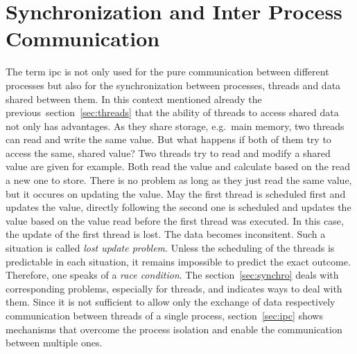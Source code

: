 \section{Synchronization and Inter Process Communication}\label{sec:ipc-and-synchro}
The term \acf{ipc} is not only used for the pure communication between different processes but also for the synchronization between processes, threads and data shared between them.
In this context mentioned already the previous~section~\ref{sec:threads} that the ability of threads to access shared data not only has advantages.
As they share storage, e.g.\ main memory, two threads can read and write the same value.
But what happens if both of them try to access the same, shared value?
Two threads try to read and modify a shared value are given for example.
Both read the value and calculate based on the read a new one to store. 
There is no problem as long as they just read the same value, but it occures on updating the value.
May the first thread is scheduled first and updates the value, directly following the second one is scheduled and updates the value based on the value read before the first thread was executed.
In this case, the update of the first thread is lost. 
The data becomes inconsitent.
Such a situation is called \textit{lost update problem}\cite{glatz2015betriebssysteme}.
Unless the scheduling of the threads is predictable in each situation, it remains impossible to predict the exact outcome.
Therefore, one speaks of a \textit{race condition}\cite{tanenbaum-modern-operating-systems}.
The section~\ref{sec:synchro} deals with corresponding problems, especially for threads, and indicates ways to deal with them.
Since it is not sufficient to allow only the exchange of data respectively communication between threads of a single process, section~\ref{sec:ipc} shows mechanisms that overcome the process isolation and enable the communication between multiple ones.

